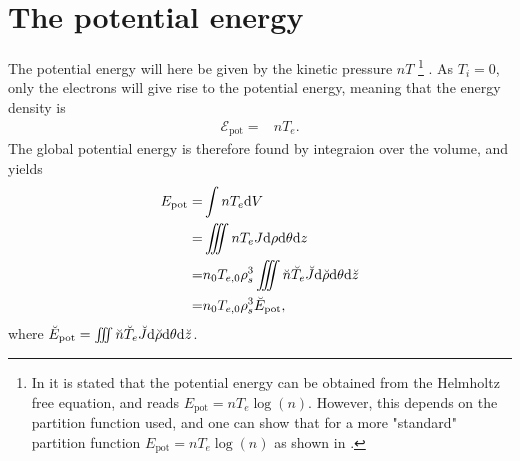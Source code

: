 %
\section{The potential energy}
%
The potential energy will here be given by the kinetic pressure $nT$
%
\footnote{In \cite{Wiesenberger2014} it is stated that the potential energy can be obtained from the Helmholtz free equation, and reads $E_{\text{pot}}=nT_e\log(n)$.
    However, this depends on the partition function used, and one can show that for a more "standard" partition function $E_{\text{pot}}=nT_e\log(n)$ as shown in \cite{Kittel1980book}.}%
.
As $T_i=0$, only the electrons will give rise to the potential energy, meaning that the energy density is
%
\begin{align*}
    \mathcal{E}_{\text{pot}} =& nT_e.
\end{align*}
%
The global potential energy is therefore found by integraion over the volume, and yields
%
\begin{align*}
    E_{\text{pot}}
    =& \int nT_e \text{d} V
    \\
    =& \iiint nT_e J \text{d}\rho \text{d}\theta \text{d} z
    \\
    =& n_0T_{e,0}\rho_s^3\iiint \breve{n}\breve{T}_e \breve{J} \text{d}\breve{\rho} \text{d}\theta \text{d} \breve{z}
    \\
    =& n_0T_{e,0}\rho_s^3\breve{E}_{\text{pot}},
\end{align*}
%
where $\breve{E}_{\text{pot}} = \iiint \breve{n}\breve{T}_e \breve{J} \text{d}\breve{\rho} \text{d}\theta \text{d} \breve{z}$.

